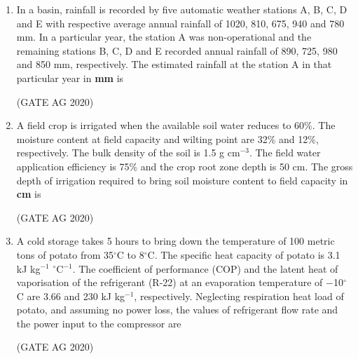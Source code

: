 \documentclass[journal]{IEEEtran}
\begin{document}
\begin{enumerate}
\medskip

\item 
In a basin, rainfall is recorded by five automatic weather stations A, B, C, D and E with respective average annual rainfall of 1020, 810, 675, 940 and 780 mm. In a particular year, the station A was non-operational and the remaining stations B, C, D and E recorded annual rainfall of 890, 725, 980 and 850 mm, respectively. The estimated rainfall at the station A in that particular year in \textbf{mm} is
\begin{enumerate}
\end{enumerate}
\hfill(GATE AG 2020)\\

\medskip

\item 
A field crop is irrigated when the available soil water reduces to 60\%. The moisture content at field capacity and wilting point are 32\% and 12\%, respectively. The bulk density of the soil is 1.5 g cm$^{-3}$. The field water application efficiency is 75\% and the crop root zone depth is 50 cm. The gross depth of irrigation required to bring soil moisture content to field capacity in \textbf{cm} is
\begin{enumerate}
\end{enumerate}
\hfill(GATE AG 2020)\\

\medskip

\item 
A cold storage takes 5 hours to bring down the temperature of 100 metric tons of potato from 35$^\circ$C to 8$^\circ$C. The specific heat capacity of potato is 3.1 kJ kg$^{-1}$ $^\circ$C$^{-1}$. The coefficient of performance (COP) and the latent heat of vaporisation of the refrigerant (R-22) at an evaporation temperature of $-$10$^\circ$C are 3.66 and 230 kJ kg$^{-1}$, respectively. Neglecting respiration heat load of potato, and assuming no power loss, the values of refrigerant flow rate and the power input to the compressor are
\begin{enumerate}
\end{enumerate}
\hfill(GATE AG 2020)\\


\end{enumerate}
\end{document}
